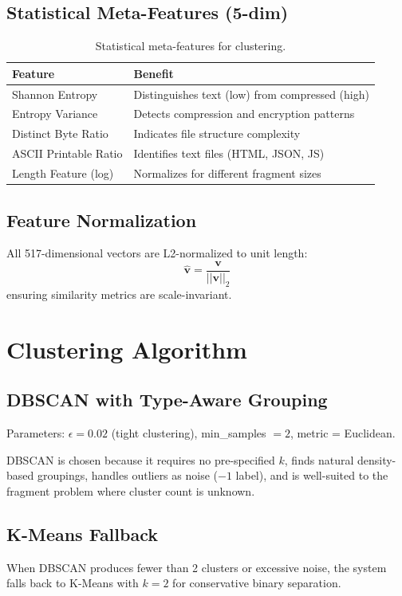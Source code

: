 \documentclass[12pt,a4paper]{report}
\begin{document}
\begin{normalsize}
{\subsection{Statistical Meta-Features (5-dim)}
\begin{table}[H]
\centering
\caption{Statistical meta-features for clustering.}
\label{tab:cluster_features}
\begin{tabular}{ll}
\toprule
\textbf{Feature} & \textbf{Benefit} \\
\midrule
Shannon Entropy & Distinguishes text (low) from compressed (high) \\
Entropy Variance & Detects compression and encryption patterns \\
Distinct Byte Ratio & Indicates file structure complexity \\
ASCII Printable Ratio & Identifies text files (HTML, JSON, JS) \\
Length Feature (log) & Normalizes for different fragment sizes \\
\bottomrule
\end{tabular}
\end{table}

\subsection{Feature Normalization}
All 517-dimensional vectors are L2-normalized to unit length:
\begin{equation}
    \hat{\mathbf{v}} = \frac{\mathbf{v}}{||\mathbf{v}||_2}
\end{equation}
ensuring similarity metrics are scale-invariant.
\par}

\section{Clustering Algorithm}
{\setlength{\baselineskip}{1.0\baselineskip}

\subsection{DBSCAN with Type-Aware Grouping}
Parameters: $\epsilon = 0.02$ (tight clustering), min\_samples $= 2$, metric = Euclidean.

DBSCAN is chosen because it requires no pre-specified $k$, finds natural density-based groupings, handles outliers as noise ($-1$ label), and is well-suited to the fragment problem where cluster count is unknown.

\subsection{K-Means Fallback}
When DBSCAN produces fewer than 2 clusters or excessive noise, the system falls back to K-Means with $k = 2$ for conservative binary separation.
\par}

\end{normalsize}
\end{document}
